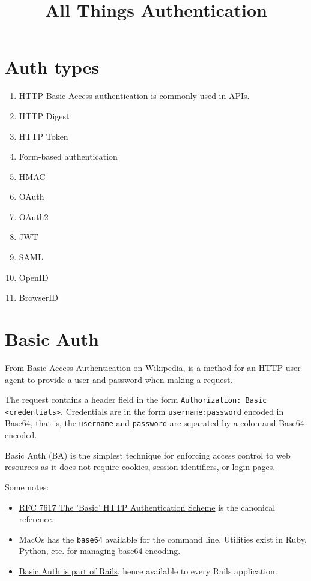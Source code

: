 \documentclass{article}
\title{All Things Authentication}
\begin{document}
\maketitle

\section{Auth types}


\begin{enumerate}
  \item HTTP Basic Access authentication is commonly used in APIs.
  \item HTTP Digest
  \item HTTP Token
  \item Form-based authentication
  \item HMAC
  \item OAuth
  \item OAuth2
  \item JWT
  \item SAML
  \item OpenID
  \item BrowserID
\end{enumerate}

\section{Basic Auth}

From \href{https://en.wikipedia.org/wiki/Basic_access_authentication}{%
  Basic Access Authentication on Wikipedia}, is a method for an HTTP
user agent to provide a user and password when making a request.

The request contains a header field in the form \texttt{Authorization: Basic
 <credentials>}. Credentials are in the form \texttt{username:password} encoded in
Base64, that is, the \texttt{username} and \texttt{password} are separated by a colon
and Base64 encoded.

Basic Auth (BA) is the simplest technique for enforcing access control to
web resources as it does not require cookies, session identifiers, or
login pages.

Some notes:
\begin{itemize}
  \item \href{https://tools.ietf.org/html/rfc7617}{%
      RFC 7617 The 'Basic' HTTP Authentication Scheme} is the
    canonical reference.
  \item MacOs has the \texttt{base64} available for the command line. Utilities
    exist in Ruby, Python, etc. for managing base64 encoding.
  \item \href{https://api.rubyonrails.org/classes/ActionController/HttpAuthentication/Basic.html}{%
      Basic Auth is part of Rails}, hence available to every Rails application.
\end{itemize}
\end{document}
